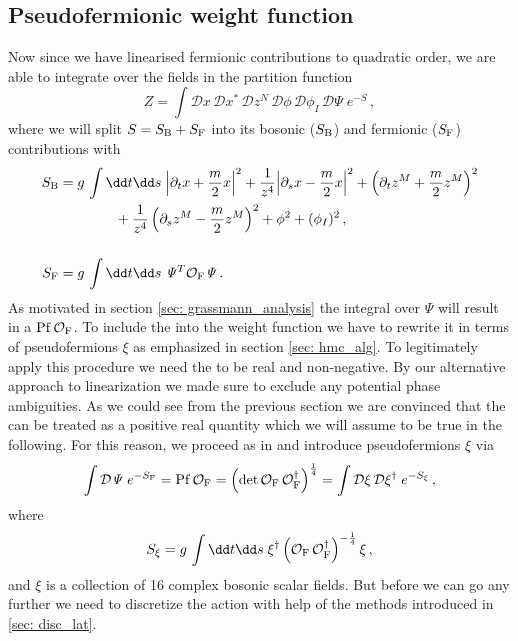 %
%
%
%
%
%
%
%
%
%
\subsection{Pseudofermionic weight function}
Now since we have linearised fermionic contributions to quadratic order, we are able to integrate over the  fields in the partition function
%
%
\begin{equation}
Z = \int \mathcal{D}x\,\mathcal{D}x^{*}\,\mathcal{D}z^{N}\,\mathcal{D}\phi\,\mathcal{D}\phi_{I}\,\mathcal{D}\mathit{\Psi}\; e^{-S}\,,
\label{eq: Z_string2}
\end{equation}
%
%
where we will split $S = S_{\rm B} + S_{\rm F}$ into its bosonic ($S_{\rm B}$) and fermionic ($S_{\rm F}$) contributions with
%
%
\begin{align}
S_{\rm B} &= g\,\int \dd t\dd s\; {\left\vert \partial_t {x} + {\frac{m}{2}}{x} \right\vert}^2 + \frac{1}{{ z}^4}{\left\vert \partial_s {x} -\frac{m}{2}{x} \right\vert}^2 + \left(\partial_t {z}^M + \frac{m}{2}{z}^M \right)^2 \notag \\
&\qquad\qquad+ \frac{1}{{ z}^4} \left(\partial_s {z}^M -\frac{m}{2}{z}^M\right)^2 + \phi^2 + (\phi_{I})^{2}\,, \label{eq: bos_act} \\[0.5cm]
S_{\rm F} &=  g\,\int \dd t\dd s\; \mathit{\Psi}^T \mathcal{O}_{\rm F} \mathit{\Psi}\,. \notag
\end{align}
%
%
As motivated in section \ref{sec: grassmann_analysis} the  integral over $\mathit{\Psi}$ will result in a  ${\rm Pf}\,\mathcal{O}_{\rm F}$. To include the  into the weight function we have to rewrite it in terms of pseudofermions $\xi$ as emphasized in section \ref{sec: hmc_alg}. To legitimately apply this procedure we need the  to be real and non-negative. By our alternative approach to linearization we made sure to exclude any potential phase ambiguities. As we could see from the previous section we are convinced that the  can be treated as a positive real quantity which we will assume to be true in the following. For this reason, we proceed as in \cite{Roiban} and introduce pseudofermions $\xi$ via
%
%
\begin{equation}
\int \mathcal{D}\mathit{\Psi}\; e^{-S_{\rm F}} = {\rm Pf}\,\mathcal{O}_{\rm F} =\left( \det \mathcal{O}_{\rm F}\,\mathcal{O}_{\rm F}^{\dagger} \right)^{\frac{1}{4}} = \int \mathcal{D}\xi\,\mathcal{D}\xi^{\dagger}\; e^{-S_{\xi}}\,,
\end{equation}
%
%
where
%
%
\begin{equation}
S_{\xi} = g\,\int \dd t\dd s \; \xi^{\dagger} \left(\mathcal{O}_{\rm F}\,\mathcal{O}_{\rm F}^{\dagger} \right)^{-\frac{1}{4}} \xi \,,
\label{eq: S_xi}
\end{equation}
and $\xi$ is a collection of 16 complex bosonic scalar fields. But before we can go any further we need to discretize the action with help of the methods introduced in \autoref{sec: disc_lat}.
%
%
%
%
%
%
%
%
%
%
